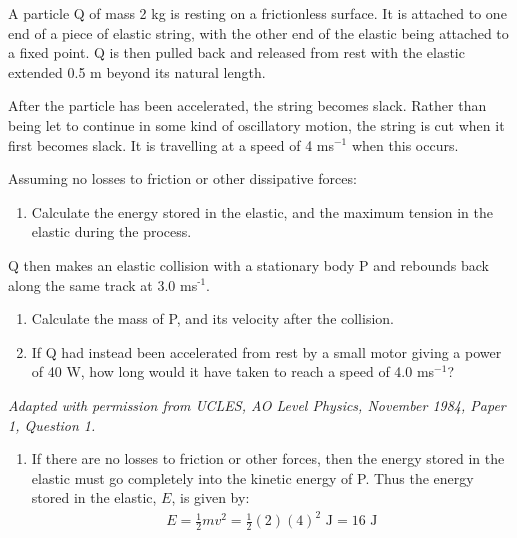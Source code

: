 
\begin{problem}[AO1984PIQ1a]
{A particle Q of mass 2 kg is resting on a frictionless surface. It is attached to one end of a piece of elastic string, with the other end of the elastic being attached to a fixed point. Q is then pulled back and released from rest with the elastic extended 0.5 m beyond its natural length. 

After the particle has been accelerated, the string becomes slack. Rather than being let to continue in some kind of oscillatory motion, the string is cut when it first becomes slack. It is travelling at a speed of 4 ms$^{-1}$ when this occurs.

Assuming no losses to friction or other dissipative forces:
\begin{enumerate}
	\item Calculate the energy stored in the elastic, and the maximum tension in the elastic during the process.
\end{enumerate}
Q then makes an elastic collision with a stationary body P and rebounds back along the same track at 3.0 ms$^{\text{-1}}$. 
\begin{enumerate}[resume]
	\item Calculate the mass of P, and its velocity after the collision.
	\item If Q had instead been accelerated from rest by a small motor giving a power of 40 W, how long would it have taken to reach a speed of 4.0 ms$^{-1}$?
\end{enumerate}
\vspace{-0.4cm}
}
{\textit{Adapted with permission from UCLES, AO Level Physics, November 1984, Paper 1, Question 1.}}
{\begin{enumerate}
	\item If there are no losses to friction or other forces, then the energy stored in the elastic must go completely into the kinetic energy of P. Thus the energy stored in the elastic, $E$, is given by:
\begin{align*} 
E = \frac{1}{2}mv^{2} = \frac{1}{2}(2)(4)^{2} \textrm{ J} = 16 \textrm{ J} 
\end{align*}


\end{enumerate}}
\end{problem}
